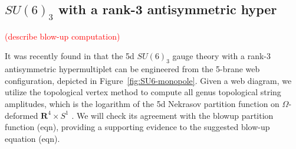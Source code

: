 \documentclass[letterpaper, 11pt]{article}
\begin{document}
\subsection{$SU(6)_3$ with a rank-3 antisymmetric hyper}

\textcolor{red}{(describe blow-up computation)}


It was recently found in \cite{Hayashi:2019yxj} that the 5d $SU(6)_3$ gauge theory with a rank-3 antisymmetric hypermultiplet can be engineered from the 5-brane web configuration, depicted in Figure~\ref{fig:SU6-monopole}. Given a web diagram, we utilize  the topological vertex method \cite{Aganagic:2003db,Iqbal:2007ii} to compute all genus topological string amplitudes, which is the logarithm of the 5d Nekrasov partition function on $\Omega$-deformed $\mathbf{R}^4\times S^1$ \cite{Gopakumar:1998jq}. We will check its agreement with the blowup partition function (eqn), providing a supporting evidence to the suggested blow-up equation (eqn).
\end{document}
